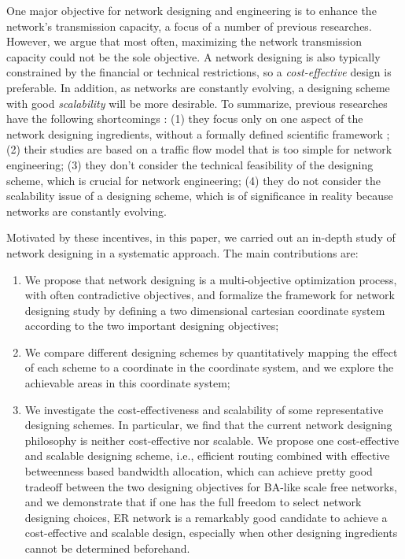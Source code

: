 \documentclass[journal]{IEEEtran}
\begin{document}
One major objective for network designing and engineering is to
enhance the network's transmission capacity, a focus of a number of
previous researches\cite{gupte-1, gupte-2,
edge-deletion,efficient-routing,onset-traffic-congestion,node-capability-redistribution
}. However, we argue that most often, maximizing the network
transmission capacity could not be the sole objective. A network
designing is also typically constrained by the financial or
technical restrictions, so a \emph{cost-effective} design is
preferable. In addition, as networks are constantly evolving, a
designing scheme with good \emph{scalability} will be more
desirable. To summarize, previous researches have the following
shortcomings : (1) they focus only on one aspect of the network
designing ingredients, without a formally defined scientific
framework ; (2) their studies are based on a traffic flow model that
is too simple for network engineering; (3) they don't consider the
technical feasibility of the designing scheme, which is crucial for
network engineering; (4) they do not consider the scalability issue
of a designing scheme, which is of significance in reality because
networks are constantly evolving.

Motivated by these incentives, in this paper, we carried out an
in-depth study of network designing in a systematic approach. The
main contributions are:
\begin{enumerate}
\item We propose that network designing is a multi-objective
optimization process, with often contradictive objectives, and
formalize the framework for network designing study by defining a
two dimensional cartesian coordinate system according to the two
important designing objectives;
\item We compare different designing schemes by quantitatively mapping the effect of each
scheme to a coordinate in the coordinate system, and we explore the
achievable areas in this coordinate system;
\item We investigate the cost-effectiveness and scalability of some
representative designing schemes. In particular, we find that the
current network designing philosophy is neither cost-effective nor
scalable. We propose one cost-effective and scalable designing
scheme, i.e., efficient routing combined with effective betweenness
based bandwidth allocation, which can achieve pretty good tradeoff
between the two designing objectives for BA-like scale free
networks, and we demonstrate that if one has the full freedom to
select network designing choices, ER network is a remarkably good
candidate to achieve a cost-effective and scalable design,
especially when other designing ingredients cannot be determined
beforehand.

\end{enumerate}
\end{document}
